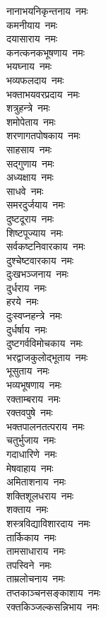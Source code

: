 \begin{flushleft}
\begin{multicols}{2}
नानाभयनिकृन्तनाय~नमः\\
कमनीयाय~नमः\\
दयासाराय~नमः\\
कनत्कनकभूषणाय~नमः\\
भयघ्नाय~नमः\\
भव्यफलदाय~नमः\\
भक्ताभयवरप्रदाय~नमः\\
शत्रुहन्त्रे~नमः\\
शमोपेताय~नमः\hfill{}\\
शरणागतपोषकाय~नमः\\
साहसाय~नमः\\
सद्गुणाय~नमः\\
अध्यक्षाय~नमः\\
साधवे~नमः\\
समरदुर्जयाय~नमः\\
दुष्टदूराय~नमः\\
शिष्टपूज्याय~नमः\\
सर्वकष्टनिवारकाय~नमः\\
दुश्चेष्टवारकाय~नमः\hfill{}\\
दुःखभञ्जनाय~नमः\\
दुर्धराय~नमः\\
हरये~नमः\\
दुःस्वप्नहन्त्रे~नमः\\
दुर्धर्षाय~नमः\\
दुष्टगर्वविमोचकाय~नमः\\
भरद्वाजकुलोद्भूताय~नमः\\
भूसुताय~नमः\\
भव्यभूषणाय~नमः\\
रक्ताम्बराय~नमः\hfill{}\\
रक्तवपुषे~नमः\\
भक्तपालनतत्पराय~नमः\\
चतुर्भुजाय~नमः\\
गदाधारिणे~नमः\\
मेषवाहाय~नमः\\
अमिताशनाय~नमः\\
शक्तिशूलधराय~नमः\\
शक्ताय~नमः\\
शस्त्रविद्याविशारदाय~नमः\\
तार्किकाय~नमः\hfill{}\\
तामसाधाराय~नमः\\
तपस्विने~नमः\\
ताम्रलोचनाय~नमः\\
तप्तकाञ्चनसङ्काशाय~नमः\\
रक्तकिञ्जल्कसन्निभाय~नमः\\

\end{multicols}
\end{flushleft}
